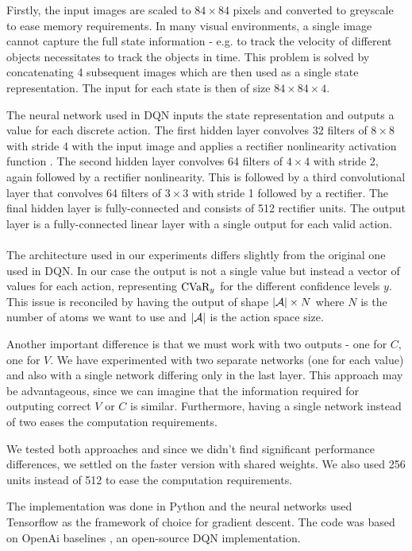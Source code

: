 Firstly, the input images are scaled to $84\times84$ pixels and converted to greyscale to ease memory requirements. In many visual environments, a single image cannot capture the full state information - e.g. to track the velocity of different objects necessitates to track the objects in time. This problem is solved by concatenating 4 subsequent images which are then used as a single state representation. The input for each state is then of size $84\times84\times4$.

The neural network used in DQN inputs the state representation and outputs a value for each discrete action. The first hidden layer convolves 32 filters of $8\times8$ with stride 4 with the input image and applies a rectifier nonlinearity activation function \citep{jarrett2009best}. The second hidden layer convolves 64 filters of $4\times4$ with stride 2, again followed by a rectifier nonlinearity. This is followed by a third convolutional layer that convolves 64 filters of $3\times3$ with stride 1 followed by a rectifier. The final hidden layer is fully-connected and consists of 512 rectifier units. The output layer is a fully-connected linear layer with a single output for each valid action.
\\
\\
The architecture used in our experiments differs slightly from the original one used in DQN. In our case the output is not a single value but instead a vector of values for each action, representing $\text{CVaR}_y$ for the different confidence levels $y$. This issue is reconciled by having the output of shape $|\mathcal{A}|\times N$ where $N$ is the number of atoms we want to use and $|\mathcal{A}|$ is the action space size.

Another important difference is that we must work with two outputs - one for $C$, one for $V$. We have experimented with two separate networks (one for each value) and also with a single network differing only in the last layer. This approach may be advantageous, since we can imagine that the information required for outputing correct $V$ or $C$ is similar. Furthermore, having a single network instead of two eases the computation requirements.

We tested both approaches and since we didn't find significant performance differences, we settled on the faster version with shared weights. We also used 256 units instead of 512 to ease the computation requirements.

The implementation was done in Python and the neural networks used Tensorflow \citep{abadi2016tensorflow} as the framework of choice for gradient descent. The code was based on OpenAi baselines \citep{baselines}, an open-source DQN implementation.


